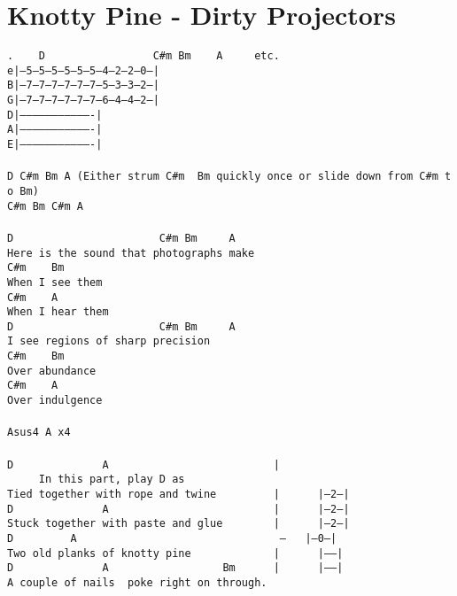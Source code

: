 \newpage
\section{Knotty Pine - Dirty Projectors}
\label{Knotty Pine - Dirty Projectors}
\texttt{.\ \ \ \ D\ \ \ \ \ \ \ \ \ \ \ \ \ \ \ \ \ C\#m\ Bm\ \ \ \ A\ \ \ \ \ etc.\\
e|---5--5--5--5--5--5--4---2--2--0--|\\
B|---7--7--7--7--7--7--5---3--3--2--|\\
G|---7--7--7--7--7--7--6---4--4--2--|\\
D|----------------------------------|\\
A|----------------------------------|\\
E|----------------------------------|\\
\\
D\ C\#m\ Bm\ A\ (Either\ strum\ C\#m\ \ Bm\ quickly\ once\ or\ slide\ down\ from\ C\#m\ to\ Bm)\\
C\#m\ Bm\ C\#m\ A\\
\\
D\ \ \ \ \ \ \ \ \ \ \ \ \ \ \ \ \ \ \ \ \ \ \ C\#m\ Bm\ \ \ \ \ A\\
Here\ is\ the\ sound\ that\ photographs\ make\\
C\#m\ \ \ \ Bm\\
When\ I\ see\ them\\
C\#m\ \ \ \ A\\
When\ I\ hear\ them\\
D\ \ \ \ \ \ \ \ \ \ \ \ \ \ \ \ \ \ \ \ \ \ \ C\#m\ Bm\ \ \ \ \ A\\
I\ see\ regions\ of\ sharp\ precision\\
C\#m\ \ \ \ Bm\\
Over\ abundance\\
C\#m\ \ \ \ A\\
Over\ indulgence\\
\\
Asus4\ A\ x4\ \\
\\
D\ \ \ \ \ \ \ \ \ \ \ \ \ \ A\ \ \ \ \ \ \ \ \ \ \ \ \ \ \ \ \ \ \ \ \ \ \ \ \ \ |\ \ \ \ \ In\ this\ part,\ play\ D\ as\\
Tied\ together\ with\ rope\ and\ twine\ \ \ \ \ \ \ \ \ |\ \ \ \ \ \ |--2--|\\
D\ \ \ \ \ \ \ \ \ \ \ \ \ \ A\ \ \ \ \ \ \ \ \ \ \ \ \ \ \ \ \ \ \ \ \ \ \ \ \ \ |\ \ \ \ \ \ |--2--|\\
Stuck\ together\ with\ paste\ and\ glue\ \ \ \ \ \ \ \ |\ \ \ \ \ \ |--2--|\\
D\ \ \ \ \ \ \ \ \ A\ \ \ \ \ \ \ \ \ \ \ \ \ \ \ \ \ \ \ \ \ \ \ \ \ \ \ \ \ \ \ \ \rbrack--\ \ \ |--0--|\\
Two\ old\ planks\ of\ knotty\ pine\ \ \ \ \ \ \ \ \ \ \ \ \ |\ \ \ \ \ \ |-----|\\
D\ \ \ \ \ \ \ \ \ \ \ \ \ \ A\ \ \ \ \ \ \ \ \ \ \ \ \ \ \ \ \ \ Bm\ \ \ \ \ \ |\ \ \ \ \ \ |-----|\\
A\ couple\ of\ nails\ \ poke\ right\ on\ through.
}
